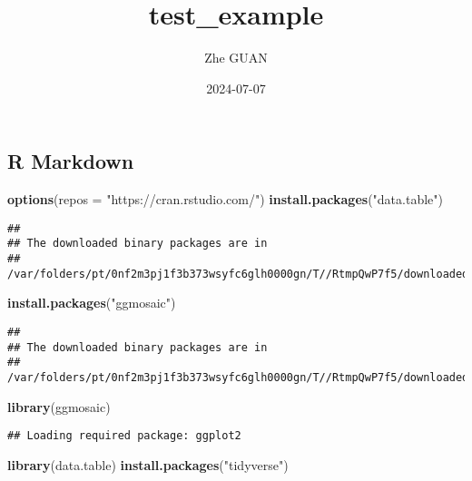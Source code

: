 \documentclass[
]{article}
\title{test\_example}
\author{Zhe GUAN}
\date{2024-07-07}
\newenvironment{Shaded}{\begin{snugshade}}{\end{snugshade}}
\newcommand{\AttributeTok}[1]{\textcolor[rgb]{0.13,0.29,0.53}{#1}}
\newcommand{\FunctionTok}[1]{\textcolor[rgb]{0.13,0.29,0.53}{\textbf{#1}}}
\newcommand{\NormalTok}[1]{#1}
\newcommand{\StringTok}[1]{\textcolor[rgb]{0.31,0.60,0.02}{#1}}
\begin{document}
\maketitle

\subsection{R Markdown}\label{r-markdown}

\begin{Shaded}
\begin{Highlighting}[]
\FunctionTok{options}\NormalTok{(}\AttributeTok{repos =} \StringTok{"https://cran.rstudio.com/"}\NormalTok{)}
\FunctionTok{install.packages}\NormalTok{(}\StringTok{"data.table"}\NormalTok{)}
\end{Highlighting}
\end{Shaded}

\begin{verbatim}
## 
## The downloaded binary packages are in
##  /var/folders/pt/0nf2m3pj1f3b373wsyfc6glh0000gn/T//RtmpQwP7f5/downloaded_packages
\end{verbatim}

\begin{Shaded}
\begin{Highlighting}[]
\FunctionTok{install.packages}\NormalTok{(}\StringTok{"ggmosaic"}\NormalTok{)}
\end{Highlighting}
\end{Shaded}

\begin{verbatim}
## 
## The downloaded binary packages are in
##  /var/folders/pt/0nf2m3pj1f3b373wsyfc6glh0000gn/T//RtmpQwP7f5/downloaded_packages
\end{verbatim}

\begin{Shaded}
\begin{Highlighting}[]
\FunctionTok{library}\NormalTok{(ggmosaic)}
\end{Highlighting}
\end{Shaded}

\begin{verbatim}
## Loading required package: ggplot2
\end{verbatim}

\begin{Shaded}
\begin{Highlighting}[]
\FunctionTok{library}\NormalTok{(data.table)}
\FunctionTok{install.packages}\NormalTok{(}\StringTok{"tidyverse"}\NormalTok{)}
\end{Highlighting}
\end{Shaded}
\end{document}
